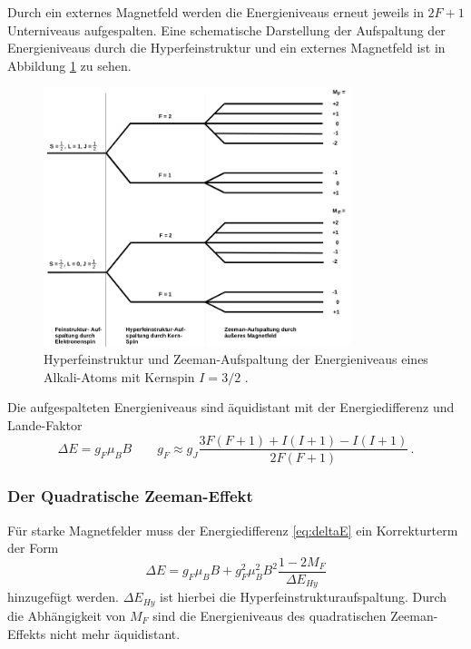 Durch ein externes Magnetfeld werden die Energieniveaus erneut jeweils in $2F+1$ Unterniveaus aufgespalten.
Eine schematische Darstellung der Aufspaltung der Energieniveaus durch die Hyperfeinstruktur und ein externes Magnetfeld ist in Abbildung \ref{fig:tfig1} zu sehen.
\FloatBarrier
\begin{figure}[h]
    \centering
    \includegraphics[width=0.8\textwidth]{Hyperfeinstruktur.png}
    \caption{Hyperfeinstruktur und Zeeman-Aufspaltung der Energieniveaus eines Alkali-Atoms mit Kernspin $I=3/2$ \cite[4]{quelle01}.}
    \label{fig:tfig1}
\end{figure}
\FloatBarrier
\noindent
Die aufgespalteten Energieniveaus sind äquidistant mit der Energiedifferenz und Lande-Faktor
\begin{equation}
\label{eq:kernspin}
\Delta E = g_F \mu_B B \qquad g_F \approx g_J \frac{3 F(F+1)+I(I+1)- I(I+1)}{2F(F+1)}\, .
\end{equation}

\subsubsection*{Der Quadratische Zeeman-Effekt}
Für starke Magnetfelder muss der Energiedifferenz \eqref{eq:deltaE} ein Korrekturterm der Form
\begin{equation}
    \label{eq:zeemanman}
\Delta E = g_F \mu_B B + g_F^2 \mu_B^2 B^2 \frac{1-2M_F}{\Delta E_{Hy}}
\end{equation}
hinzugefügt werden.
$\Delta E_{Hy}$ ist hierbei die Hyperfeinstrukturaufspaltung.
Durch die Abhängigkeit von $M_F$ sind die Energieniveaus des quadratischen Zeeman-Effekts nicht mehr äquidistant.

